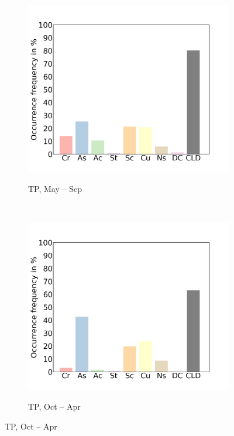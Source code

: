 \documentclass[alpha-refs]{wiley-article}
\begin{document}
\begin{figure}[!htbp]
    \begin{subfigure}[b]{0.5\textwidth}
       \centering
        \caption{TP, May -- Sep}
        \includegraphics[width=\textwidth]{cld_type_freq_TP_monsoonseason.png}
        \label{fig:cld_type1}

    \end{subfigure}%
    ~ 
        \begin{subfigure}[b]{0.5\textwidth}
       \centering
        \caption{TP, Oct -- Apr}
        \includegraphics[width=\textwidth]{cld_type_freq_TP_westerlyseason.png}
\label{fig:cld_type2}
    \end{subfigure}%
    

\end{figure}
\end{document}
